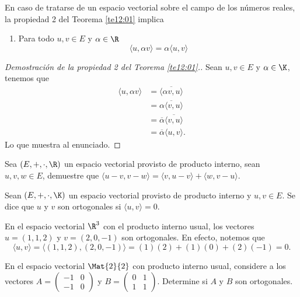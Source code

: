 \documentclass[compacto,10pt]{pubciencias-notas}
\begin{document}
\begin{advertencia}
    En caso de tratarse de un espacio vectorial sobre el campo de los números reales, la propiedad 2 del Teorema \ref{te12:01} implica
    \begin{enumerate}[start=2]
        \item
            Para todo $u,v \in E$ y $\alpha \in \R$
            \[\langle  u, \alpha v\rangle  =  \alpha\langle  u,v\rangle \]
    \end{enumerate}
\end{advertencia}

\begin{proof}[Demostración de la propiedad 2 del Teorema \ref{te12:01}.]\hspace{0pt} Sean $u,v\in E$ y $\alpha\in\K$, tenemos que
\begin{align*}
    \langle u,\alpha v\rangle  &= \overline{\langle \alpha v,u\rangle }\\
    &= \overline{\alpha\langle v,u\rangle }\\
    &= \overline{\alpha}\overline{\langle v,u\rangle }\\
    &= \overline{\alpha}\langle u,v\rangle .
\end{align*}
Lo que muestra al enunciado.
\end{proof}

\begin{ejer}\hspace{0pt} Sea $(E,+,\cdot,\R)$ un espacio vectorial provisto de producto interno, sean $u,v,w\in E$, demuestre que $\langle u - v,v - w\rangle  = \langle v,u - v\rangle  + \langle w,v-u\rangle .$
\end{ejer}

\begin{defi}
Sean $(E,+,\cdot,\K)$ un espacio vectorial provisto de producto interno y $u, v \in E$. Se dice que $u$ y $v$ son ortogonales si $\langle  u, v \rangle  = 0$.
\end{defi}

\begin{ejem}\hspace{0pt}\label{Sem08:EjemOrt} En el espacio vectorial $\R^{3}$ con el producto interno usual, los vectores $u=(1,1,2)$ y $v=(2,0,-1)$ son ortogonales. En efecto, notemos que
\[
    \langle u,v\rangle  = \langle (1,1,2),(2,0,-1)\rangle  = (1)(2) + (1)(0) + (2)(-1) = 0.
\]
\end{ejem}

\begin{ejer}\hspace{0pt} En el espacio vectorial $\Mat{2}{2}$ con producto interno usual, considere a los vectores $A = \begin{pmatrix}-1&0\\-1&0\end{pmatrix}$ y $B = \begin{pmatrix}0&1\\1&1\end{pmatrix}$. Determine si $A$ y $B$ son ortogonales.
\end{ejer}
\end{document}
